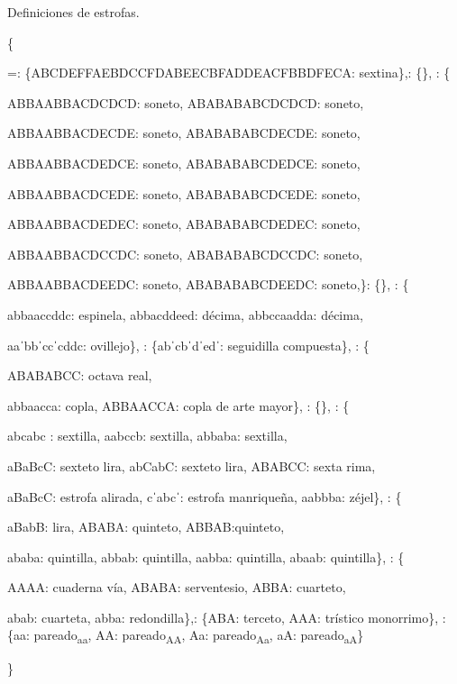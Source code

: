 \newcommand{\MYalgopar}[1]{\bgroup
	\parindent 0pt
	\leftskip 5pt
	\par
	\bgroup\everypar={\hspace{5pt}\relax}\leftskip 5pt\relax
	#1\egroup\par\egroup} 

\begin{algorithm}[!ht]
	\caption{Definiciones de estrofas.}\label{list:stanzasdef}
	\estrofas \gets \{ \;
	\MYalgopar{36: \{ABCDEFFAEBDCCFDABEECBFADDEACFBBDFECA: sextina\},\;
		15: \{\}, \;
		14: \{ \;
		\strut\hspace{2ex}\strut ABBAABBACDCDCD: soneto, ABABABABCDCDCD: soneto, \;
		\strut\hspace{2ex}\strut ABBAABBACDECDE: soneto, ABABABABCDECDE: soneto, \;
		\strut\hspace{2ex}\strut ABBAABBACDEDCE: soneto, ABABABABCDEDCE: soneto, \;
		\strut\hspace{2ex}\strut ABBAABBACDCEDE: soneto, ABABABABCDCEDE: soneto, \;
		\strut\hspace{2ex}\strut ABBAABBACDEDEC: soneto, ABABABABCDEDEC: soneto, \;
		\strut\hspace{2ex}\strut ABBAABBACDCCDC: soneto, ABABABABCDCCDC: soneto, \;
		\strut\hspace{2ex}\strut ABBAABBACDEEDC: soneto, ABABABABCDEEDC: soneto,\}\;
		11: \{\}, \;
		10: \{ \;
		\strut\hspace{2ex}\strut abbaaccddc: espinela, abbacddeed: décima, abbccaadda: décima, \;
		\strut\hspace{2ex}\strut aaˈbbˈccˈcddc: ovillejo\}, \;
		9: \{abˈcbˈdˈedˈ: seguidilla compuesta\}, \;
		8: \{ \;
		\strut\hspace{2ex}\strut ABABABCC: octava real, \;
		\strut\hspace{2ex}\strut abbaacca: copla, ABBAACCA: copla de arte mayor\}, \;
		7: \{\}, \;
		6: \{ \;
		\strut\hspace{2ex}\strut abcabc : sextilla, aabccb: sextilla, abbaba: sextilla, \;
		\strut\hspace{2ex}\strut aBaBcC: sexteto lira, abCabC: sexteto lira, ABABCC: sexta rima,\;
		\strut\hspace{2ex}\strut aBaBcC: estrofa alirada,
		cˈabcˈ: estrofa manriqueña, aabbba: zéjel\}, \;
		5: \{ \;
		\strut\hspace{2ex}\strut aBabB: lira, ABABA: quinteto, ABBAB:quinteto, \;
		\strut\hspace{2ex}\strut ababa: quintilla, abbab: quintilla, aabba: quintilla, abaab: quintilla\}, \;
		4: \{\;
		\strut\hspace{2ex}\strut AAAA: cuaderna vía, ABABA: serventesio, ABBA: cuarteto,\;
		\strut\hspace{2ex}\strut abab: cuarteta, abba: redondilla\},\;
		3: \{ABA: terceto, AAA: trístico monorrimo\}, \;
		2: \{aa: pareado\textsubscript{aa}, AA: pareado\textsubscript{AA}, Aa: pareado\textsubscript{Aa}, aA: pareado\textsubscript{aA}\}}\}
\end{algorithm}

